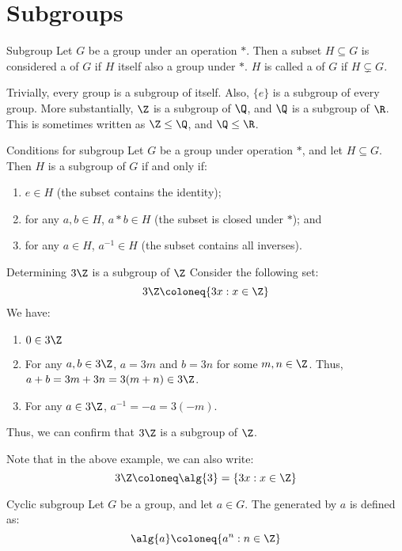 \section{Subgroups}

\begin{dfnbox}{Subgroup}{}
    Let $G$ be a group under an operation $*$. Then a subset $H \subseteq G$ is considered a  of $G$ if $H$ itself also a group under $*$. $H$ is called a  of $G$ if $H \subsetneq G$.
\end{dfnbox}

Trivially, every group is a subgroup of itself. Also, $\{e\}$ is a subgroup of every group. More substantially, $\Z$ is a subgroup of $\Q$, and $\Q$ is a subgroup of $\R$. This is sometimes written as $\Z \leq \Q$, and $\Q \leq \R$.

\begin{thmbox}{Conditions for subgroup}{}
    Let $G$ be a group under operation $*$, and let $H \subseteq G$. Then $H$ is a subgroup of $G$ if and only if:
    \begin{enumerate}
        \item $e \in H$ (the subset contains the identity);
        \item for any $a,b \in H$, $a * b \in H$ (the subset is closed under $*$); and
        \item for any $a \in H$, $a^{-1} \in H$ (the subset contains all inverses).
    \end{enumerate}
\end{thmbox}

\begin{exbox}{Determining $3\Z$ is a subgroup of $\Z$}{}
    Consider the following set:
    \[ 3\Z \coloneq \{3x : x \in \Z\} \]
    We have:
    \begin{enumerate}
        \item $0 \in 3\Z$
        \item For any $a,b \in 3\Z$, $a = 3m$ and $b = 3n$ for some $m,n \in \Z$. Thus, $a+b = 3m + 3n = 3(m+n) \in 3\Z$.
        \item For any $a \in 3\Z$, $a^{-1} = -a = 3(-m)$.
    \end{enumerate}
    Thus, we can confirm that $3\Z$ is a subgroup of $\Z$.
\end{exbox}

Note that in the above example, we can also write:
\[ 3\Z \coloneq \alg{3} = \{3x : x \in \Z\} \]

\begin{dfnbox}{Cyclic subgroup}{}
    Let $G$ be a group, and let $a \in G$. The  generated by $a$ is defined as:
    \[ \alg{a} \coloneq \{ a^n : n \in \Z \} \]
\end{dfnbox}

